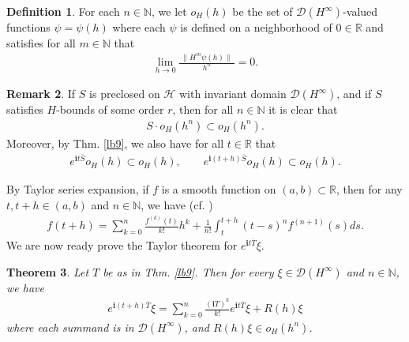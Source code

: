 \documentclass[12pt,a4paper,notitlepage]{article}
\theoremstyle{definition}
\newtheorem{df}{Definition}[subsection]
\newtheorem{rem}[df]{Remark}
\theoremstyle{plain}
\newtheorem{thm}[df]{Theorem}
\newcommand{\mc}{\mathcal}
\newcommand{\ovl}{\overline}
\newcommand{\Dom}{\scr D}
\newcommand{\scr}{\mathscr}
\newcommand{\im}{\mathbf{i}}
\newcommand{\Nbb}{\mathbb N}
\newcommand{\Rbb}{\mathbb R}
\numberwithin{equation}{subsection}
\begin{document}
\begin{df}
For each $n\in\Nbb$, we let $o_H(h)$  be the set of $\Dom(H^\infty)$-valued functions $\psi=\psi(h)$ where each $\psi$ is  defined on a neighborhood of $0\in\Rbb$ and satisfies  for all $m\in\Nbb$ that
\begin{align}
	\lim_{h\rightarrow 0}\frac{~\lVert H^m \psi(h)\lVert~}{h^n}=0.\label{eq16} 
\end{align}

\end{df}



\begin{rem}\label{lb11}
If $S$ is preclosed on $\mc H$ with invariant domain $\Dom(H^\infty)$, and if $S$ satisfies $H$-bounds of some order $r$, then for all $n\in\Nbb$ it is clear that
\begin{align*}
S\cdot o_H(h^n)\subset o_H(h^n).	
\end{align*}
Moreover, by Thm. \ref{lb9}, we also have for all $t\in\Rbb$ that
\begin{align*}
e^{\im t\ovl S}o_H(h)\subset o_H(h),\qquad e^{\im (t+h)\ovl S}o_H(h)\subset o_H(h).	
\end{align*}
\end{rem}

By Taylor series expansion, if $f$ is a smooth function on $(a,b)\subset\Rbb$, then for any $t,t+h\in(a,b)$ and $n\in\Nbb$, we have (cf. \cite[Thm. 9.29]{Apo})
\begin{align}
	f(t+h)=\sum_{k=0}^n\frac{f^{(k)}(t)}{k!}h^k+\frac 1{n!}\int_t^{t+h}(t-s)^nf^{(n+1)}(s)ds.	\label{eq15}
\end{align}
We are now ready prove the Taylor theorem for $e^{\im t\ovl T}\xi$.

\begin{thm}\label{lb10}
Let $T$ be as in Thm. \ref{lb9}. Then for every $\xi\in\Dom(H^\infty)$ and $n\in\Nbb$, we have
\begin{align}
e^{\im(t+h)\ovl T}\xi=\sum_{k=0}^n\frac{(\im T)^k}{k!}e^{\im t\ovl T}\xi+R(h)\xi	
\end{align}
where each summand is in $\Dom(H^\infty)$, and  $R(h)\xi\in o_H(h^n)$.
\end{thm}
\end{document}
